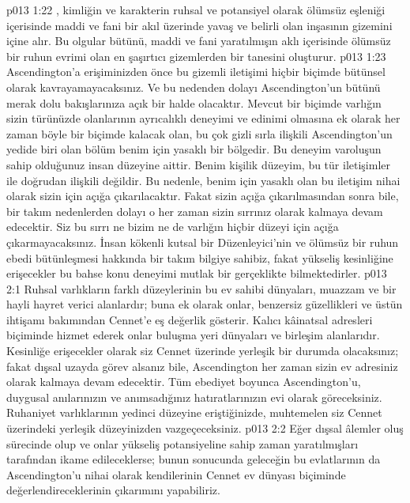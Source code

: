 \vs p013 1:22 , kimliğin ve karakterin ruhsal ve potansiyel olarak ölümsüz eşleniği içerisinde maddi ve fani bir akıl üzerinde yavaş ve belirli olan inşasının gizemini içine alır. Bu olgular bütünü, maddi ve fani yaratılmışın aklı içerisinde ölümsüz bir ruhun evrimi olan en şaşırtıcı gizemlerden bir tanesini oluşturur.
\vs p013 1:23 Ascendington’a erişiminizden önce bu gizemli iletişimi hiçbir biçimde bütünsel olarak kavrayamayacaksınız. Ve bu nedenden dolayı Ascendington’un bütünü merak dolu bakışlarınıza açık bir halde olacaktır. Mevcut bir biçimde varlığın sizin türünüzde olanlarının ayrıcalıklı deneyimi ve edinimi olmasına ek olarak her zaman böyle bir biçimde kalacak olan, bu çok gizli sırla ilişkili Ascendington’un yedide biri olan bölüm benim için yasaklı bir bölgedir. Bu deneyim varoluşun sahip olduğunuz insan düzeyine aittir. Benim kişilik düzeyim, bu tür iletişimler ile doğrudan ilişkili değildir. Bu nedenle, benim için yasaklı olan bu iletişim nihai olarak sizin için açığa çıkarılacaktır. Fakat sizin açığa çıkarılmasından sonra bile, bir takım nedenlerden dolayı o her zaman sizin sırrınız olarak kalmaya devam edecektir. Siz bu sırrı ne bizim ne de varlığın hiçbir düzeyi için açığa çıkarmayacaksınız. İnsan kökenli kutsal bir Düzenleyici’nin ve ölümsüz bir ruhun ebedi bütünleşmesi hakkında bir takım bilgiye sahibiz, fakat yükseliş kesinliğine erişecekler bu bahse konu deneyimi mutlak bir gerçeklikte bilmektedirler.
\vs p013 2:1 Ruhsal varlıkların farklı düzeylerinin bu ev sahibi dünyaları, muazzam ve bir hayli hayret verici alanlardır; buna ek olarak onlar, benzersiz güzellikleri ve üstün ihtişamı bakımından Cennet’e eş değerlik gösterir. Kalıcı kâinatsal adresleri biçiminde hizmet ederek onlar buluşma yeri dünyaları ve birleşim alanlarıdır. Kesinliğe erişecekler olarak siz Cennet üzerinde yerleşik bir durumda olacaksınız; fakat dışsal uzayda görev alsanız bile, Ascendington her zaman sizin ev adresiniz olarak kalmaya devam edecektir. Tüm ebediyet boyunca Ascendington’u, duygusal anılarınızın ve anımsadığınız hatıratlarınızın evi olarak göreceksiniz. Ruhaniyet varlıklarının yedinci düzeyine eriştiğinizde, muhtemelen siz Cennet üzerindeki yerleşik düzeyinizden vazgeçeceksiniz.
\vs p013 2:2 Eğer dışsal âlemler oluş sürecinde olup ve onlar yükseliş potansiyeline sahip zaman yaratılmışları tarafından ikame edileceklerse; bunun sonucunda geleceğin bu evlatlarının da Ascendington’u nihai olarak kendilerinin Cennet ev dünyası biçiminde değerlendireceklerinin çıkarımını yapabiliriz.
